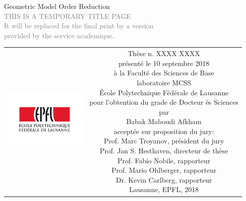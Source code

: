 \begin{titlepage}
\begin{center}
\sffamily


\null\vspace{2cm}
{\huge Geometric Model Order Reduction} \\[24pt] 
\textcolor{gray}{\small{THIS IS A TEMPORARY TITLE PAGE \\ It will be replaced for the final print by a version \\ provided by the service academique.}}
    
\vfill

\begin{tabular} {cc}
\parbox{0.3\textwidth}{\includegraphics[width=4cm]{images/epfl}}
&
\parbox{0.7\textwidth}{%
	Thèse n. XXXX XXXX\\
	présenté le 10 septembre 2018\\
	à la Faculté des Sciences de Base\\
	laboratoire MCSS\\
%
	École Polytechnique Fédérale de Lausanne\\[6pt]
	pour l'obtention du grade de Docteur ès Sciences\\
	par\\ [4pt]
	\null \hspace{3em} Babak Maboudi Afkham\\[9pt]
%
\small
acceptée sur proposition du jury:\\[4pt]
%
    Prof. Marc Troyanov, président du jury\\
    Prof. Jan S. Hesthaven, directeur de thèse\\
    Prof. Fabio Nobile, rapporteur\\
    Prof. Mario Ohlberger, rapporteur\\
    Dr. Kevin Carlberg, rapporteur\\[12pt]
%
Lausanne, EPFL, 2018}
\end{tabular}
\end{center}
\vspace{2cm}
\end{titlepage}



